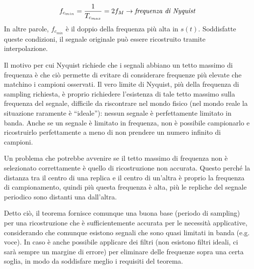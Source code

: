 \begin{equation}
    f_{c_{min}} = \frac{1}{T_{c_{max}}} = 2f_M \rightarrow \text{\textit{frequenza di Nyquist}}
\end{equation}
In altre parole, $f_{c_{min}}$ è il doppio della frequenza più alta in $s(t)$.
Soddisfatte queste condizioni, il segnale originale può essere ricostruito tramite interpolazione.


Il motivo per cui Nyquist richiede che i segnali abbiano un tetto massimo di frequenza è che ciò permette di evitare di considerare frequenze più elevate che matchino i campioni osservati.
Il vero limite di Nyquist, più della frequenza di sampling richiesta, è proprio richiedere l'esistenza di tale tetto massimo sulla frequenza del segnale, difficile da riscontrare nel mondo fisico (nel mondo reale la situazione raramente è ``ideale''): nessun segnale è perfettamente limitato in banda. Anche se un segnale è limitato in frequenza, non è possibile campionarlo e ricostruirlo perfettamente a meno di non prendere un numero infinito di campioni.


Un problema che potrebbe avvenire se il tetto massimo di frequenza non è selezionato correttamente è quello di ricostruzione non accurata. Questo perché la distanza tra il centro di una replica e il centro di un'altra è proprio la frequenza di campionamento, quindi più questa frequenza è alta, più le repliche del segnale periodico sono distanti una dall'altra. 

Detto ciò, il teorema fornisce comunque una buona base (periodo di sampling) per una ricostruzione che è sufficientemente accurata per le necessità applicative, considerando che comunque esistono segnali che sono quasi limitati in banda (e.g. voce). In caso è anche possibile applicare dei filtri (non esistono filtri ideali, ci sarà sempre un margine di errore) per eliminare delle frequenze sopra una certa soglia, in modo da soddisfare meglio i requisiti del teorema.

